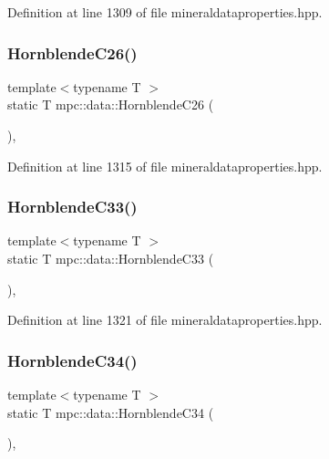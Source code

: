 Definition at line 1309 of file mineraldataproperties.\+hpp.

\mbox{\label{namespacempc_1_1data_afe3ff9d089373edc9f59f18cf332d248}} 
\subsubsection{\texorpdfstring{Hornblende\+C26()}{HornblendeC26()}}
{\footnotesize\ttfamily template$<$typename T $>$ \\
static T mpc\+::data\+::\+Hornblende\+C26 (\begin{DoxyParamCaption}{ }\end{DoxyParamCaption})\hspace{0.3cm}{\ttfamily [inline]}, {\ttfamily [static]}}



Definition at line 1315 of file mineraldataproperties.\+hpp.

\mbox{\label{namespacempc_1_1data_a633fd0ce53057d818dcbb260ee8fa620}} 
\subsubsection{\texorpdfstring{Hornblende\+C33()}{HornblendeC33()}}
{\footnotesize\ttfamily template$<$typename T $>$ \\
static T mpc\+::data\+::\+Hornblende\+C33 (\begin{DoxyParamCaption}{ }\end{DoxyParamCaption})\hspace{0.3cm}{\ttfamily [inline]}, {\ttfamily [static]}}



Definition at line 1321 of file mineraldataproperties.\+hpp.

\mbox{\label{namespacempc_1_1data_af11fafc727d70478d7a0ee0c7f1bdffd}} 
\subsubsection{\texorpdfstring{Hornblende\+C34()}{HornblendeC34()}}
{\footnotesize\ttfamily template$<$typename T $>$ \\
static T mpc\+::data\+::\+Hornblende\+C34 (\begin{DoxyParamCaption}{ }\end{DoxyParamCaption})\hspace{0.3cm}{\ttfamily [inline]}, {\ttfamily [static]}}



